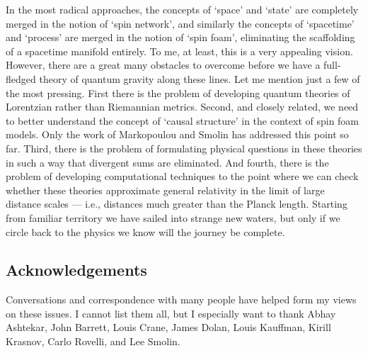 In the most radical approaches, the concepts of `space' and `state' are
completely merged in the notion of `spin network',  and similarly the
concepts of `spacetime' and `process' are merged in the notion of `spin
foam', eliminating the scaffolding of a spacetime manifold entirely.  To
me, at least, this is a very appealing vision.  However, there are a
great many obstacles to overcome before we have a full-fledged theory
of quantum gravity along these lines. Let me mention just a few of the
most pressing.   First there is the problem of developing quantum
theories of Lorentzian rather than Riemannian metrics.  Second, and
closely related, we need to better understand the concept of `causal
structure' in the context of spin foam models.  Only the work of
Markopoulou and Smolin \cite{MS} has addressed this point so far. 
Third, there is the problem of formulating physical questions in these
theories in such a way that divergent sums are eliminated.  And fourth,
there is the problem of developing computational techniques to the point
where we can check whether these theories approximate general relativity
in the limit of large distance scales --- i.e., distances much greater
than the Planck length.  Starting from familiar territory we have
sailed into strange new waters, but only if we circle back to the
physics we know will the journey be complete.  

\subsection*{Acknowledgements}

Conversations and correspondence with many people have helped form my
views on these issues.  I cannot list them all, but I especially want to
thank Abhay Ashtekar, John Barrett, Louis Crane, James Dolan, Louis
Kauffman, Kirill Krasnov, Carlo Rovelli, and Lee Smolin.


